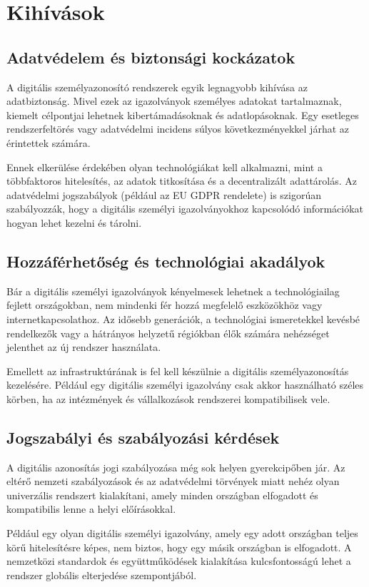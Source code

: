 \documentclass[
]{thesis-ekf}
\theoremstyle{definition}
\theoremstyle{remark}
\begin{document}
	\section{Kihívások}
	\subsection{Adatvédelem és biztonsági kockázatok}
	A digitális személyazonosító rendszerek egyik legnagyobb kihívása az adatbiztonság. Mivel ezek az igazolványok személyes adatokat tartalmaznak, kiemelt célpontjai lehetnek kibertámadásoknak és adatlopásoknak. Egy esetleges rendszerfeltörés vagy adatvédelmi incidens súlyos következményekkel járhat az érintettek számára.
	
	Ennek elkerülése érdekében olyan technológiákat kell alkalmazni, mint a többfaktoros hitelesítés, az adatok titkosítása és a decentralizált adattárolás. Az adatvédelmi jogszabályok (például az EU GDPR rendelete) is szigorúan szabályozzák, hogy a digitális személyi igazolványokhoz kapcsolódó információkat hogyan lehet kezelni és tárolni.
	\subsection{Hozzáférhetőség és technológiai akadályok}
	Bár a digitális személyi igazolványok kényelmesek lehetnek a technológiailag fejlett országokban, nem mindenki fér hozzá megfelelő eszközökhöz vagy internetkapcsolathoz. Az idősebb generációk, a technológiai ismeretekkel kevésbé rendelkezők vagy a hátrányos helyzetű régiókban élők számára nehézséget jelenthet az új rendszer használata.
	
	Emellett az infrastruktúrának is fel kell készülnie a digitális személyazonosítás kezelésére. Például egy digitális személyi igazolvány csak akkor használható széles körben, ha az intézmények és vállalkozások rendszerei kompatibilisek vele.
	\subsection{Jogszabályi és szabályozási kérdések}
	A digitális azonosítás jogi szabályozása még sok helyen gyerekcipőben jár. Az eltérő nemzeti szabályozások és az adatvédelmi törvények miatt nehéz olyan univerzális rendszert kialakítani, amely minden országban elfogadott és kompatibilis lenne a helyi előírásokkal.
	
	Például egy olyan digitális személyi igazolvány, amely egy adott országban teljes körű hitelesítésre képes, nem biztos, hogy egy másik országban is elfogadott. A nemzetközi standardok és együttműködések kialakítása kulcsfontosságú lehet a rendszer globális elterjedése szempontjából.
	
\end{document}
